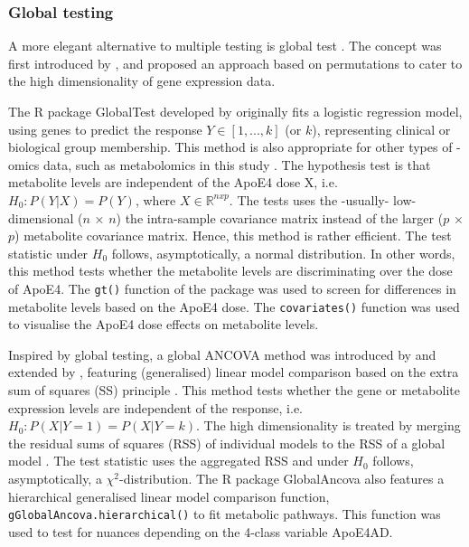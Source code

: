 \documentclass{amsart}
\theoremstyle{plain}
\begin{document}
\subsubsection{Global testing}
A more elegant alternative to multiple testing is global test \cite{Simon2004DesignHealth}. The concept was first introduced by \citeauthor{Simon2004DesignHealth}, and proposed an approach based on permutations to cater to the high dimensionality of gene expression data.

The R package \textsf{GlobalTest} \cite{Goeman2004AOutcome, Goeman2006TestingAlternative, Goeman2023ThePackage} developed by \citeauthor{Goeman2004AOutcome} originally fits a logistic regression model, using genes to predict the response $Y \in [1,..., k]$ (or $k$), representing clinical or biological group membership. This method is also appropriate for other types of -omics data, such as metabolomics in this study \cite{Goeman2023ThePackage}.
The hypothesis test is that metabolite levels are independent of the ApoE4 dose X, i.e. $H_0 : P(Y|X) = P(Y)$, where $X \in \mathbb{R}^{n x p}$. The tests uses the -usually- low-dimensional ($n$ × $n$) the intra-sample covariance matrix instead of the larger ($p$ × $p$) metabolite covariance matrix. Hence, this method is rather efficient. The test statistic under $H_0$ follows, asymptotically, a normal distribution. In other words, this method tests whether the metabolite levels are discriminating over the dose of ApoE4. The \texttt{gt()} function of the package was used to screen for differences in metabolite levels based on the ApoE4 dose. The \texttt{covariates()} function was used to visualise the ApoE4 dose effects on metabolite levels.

Inspired by global testing, a global ANCOVA method was introduced  by \citeauthor{Mansmann2005TestingApproach} and  extended by \citeauthor{Hummel2008GlobalANCOVA:Effects}, featuring (generalised) linear model comparison based on the extra sum of squares (SS) principle \cite{Hummel2023GlobalExpression}. This method tests whether the gene or metabolite expression levels are independent of the response, i.e. $H_0 : P(X|Y = 1) = P(X|Y = k)$. The high dimensionality is treated by merging the residual sums of squares (RSS) of individual models to the RSS of a global model \cite{Hummel2023GlobalExpression}. The test statistic uses the aggregated RSS and under $H_0$ follows, asymptotically, a $\chi^2$-distribution. The R package \textsf{GlobalAncova} also features a hierarchical generalised linear model comparison function, \texttt{gGlobalAncova.hierarchical()} to fit metabolic pathways. This function was used to test for nuances depending on the 4-class variable ApoE4AD.
\end{document}
